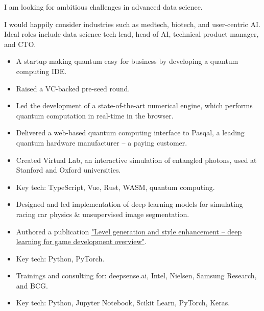 \documentclass[10pt,a4paper,ragged2e,withhyper]{altacv}
\begin{document}
\begin{paracol}{2}


I am looking for ambitious challenges in advanced data science.

\divider

I would happily consider industries such as medtech, biotech, and user-centric AI. Ideal roles include data science tech lead, head of AI, technical product manager, and CTO.


\begin{itemize}
\item A startup making quantum easy for business by developing a quantum computing IDE.
\item Raised a VC-backed pre-seed round.
\item Led the development of a state-of-the-art numerical engine, which performs quantum computation in real-time in the browser.
\item Delivered a web-based quantum computing interface to Pasqal, a leading quantum hardware manufacturer -- a paying customer.
\item Created Virtual Lab, an interactive simulation of entangled photons, used at Stanford and Oxford universities.
\item Key tech: TypeScript, Vue, Rust, WASM, quantum computing.
\end{itemize}

\divider

\begin{itemize}
\item Designed and led implementation of deep learning models for simulating racing car physics \& unsupervised image segmentation.
\item Authored a publication \href{https://arxiv.org/abs/2107.07397}{"Level generation and style enhancement -- deep learning for game development overview"}.
\item Key tech: Python, PyTorch.
\end{itemize}

\divider

\begin{itemize}
\item Trainings and consulting for: deepsense.ai, Intel, Nielsen, Samsung Research, and BCG.
\item Key tech: Python, Jupyter Notebook, Scikit Learn, PyTorch, Keras.
\end{itemize}


\end{paracol}
\end{document}
